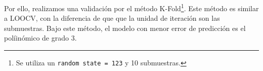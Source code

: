 \documentclass[11pt,oneside]{article}
\newcommand{\code}{\texttt}
\begin{document}
Por ello, realizamos una validación por el método K-Fold\footnote{Se utiliza un \code{random state = 123} y 10 submuestras.}. Este método es similar a LOOCV, con la diferencia de que que la unidad de iteración son las submuestras. Bajo este método, el modelo con menor error de predicción es el políinómico de grado 3.


	
	\newpage
	
	
	
	
\end{document}
